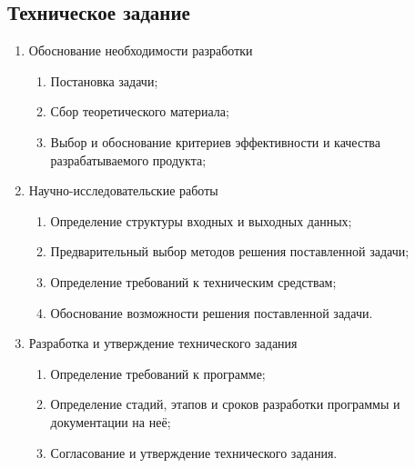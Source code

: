 \documentclass{../TechDoc}
\begin{document}
	\subsection{Техническое задание}
	\begin{enumerate}
		\item Обоснование необходимости разработки 
		\begin{enumerate}
			\item Постановка задачи;
			\item Сбор теоретического материала;
			\item Выбор и обоснование критериев эффективности и качества разрабатываемого продукта;
		\end{enumerate}
		
		
		\item Научно-исследовательские работы
		\begin{enumerate}
			\item Определение структуры входных и выходных данных;
			\item Предварительный выбор методов решения поставленной задачи;
			\item Определение требований к техническим средствам;
			\item Обоснование возможности решения поставленной задачи.
		\end{enumerate}
		
		\item Разработка и утверждение технического задания
		\begin{enumerate}
			\item Определение требований к программе;
			\item Определение стадий, этапов и сроков разработки программы и документации на неё;
			\item Согласование и утверждение технического задания.
		\end{enumerate}
		
	\end{enumerate}
	
\end{document}
